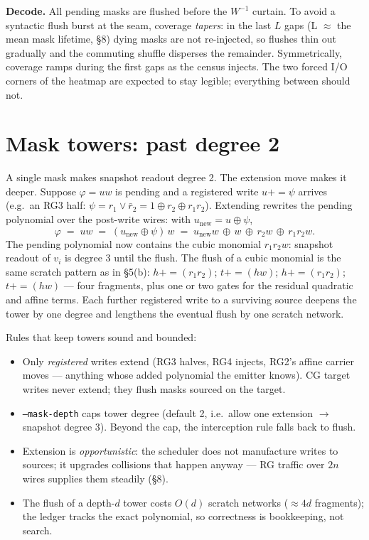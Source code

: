 \documentclass[11pt]{article}
\newcommand{\code}[1]{\texttt{#1}}
\newcommand{\pe}{\mathrel{{+}{=}}}    %
\begin{document}
\textbf{Decode.} All pending masks are flushed before the $W^{-1}$
curtain. To avoid a syntactic flush burst at the seam, coverage
\emph{tapers}: in the last $L$ gaps (L $\approx$ the mean mask lifetime,
\S8) dying masks are not re-injected, so flushes thin out gradually and
the commuting shuffle disperses the remainder. Symmetrically, coverage
ramps during the first gaps as the census injects. The two forced I/O
corners of the heatmap are expected to stay legible; everything between
should not.

\section{Mask towers: past degree 2}\label{sec:towers}

A single mask makes snapshot readout degree 2. The extension move makes it
deeper. Suppose $\varphi = u w$ is pending and a registered write $u \pe
\psi$ arrives (e.g.\ an RG3 half: $\psi = r_1 \vee \bar r_2 = 1 \oplus r_2
\oplus r_1 r_2$). Extending rewrites the pending polynomial over the
post-write wires: with $u_{\text{new}} = u \oplus \psi$,
\[
\varphi \;=\; u w \;=\; (u_{\text{new}} \oplus \psi)\,w
\;=\; u_{\text{new}} w \,\oplus\, w \,\oplus\, r_2 w \,\oplus\, r_1 r_2 w .
\]
The pending polynomial now contains the cubic monomial $r_1 r_2 w$:
snapshot readout of $v_i$ is degree 3 until the flush. The flush of a
cubic monomial is the same scratch pattern as in \S5(b):
$h \pe (r_1 r_2)$; $t \pe (h w)$; $h \pe (r_1 r_2)$; $t \pe (h w)$ ---
four fragments, plus one or two gates for the residual quadratic and
affine terms. Each further registered write to a surviving source deepens
the tower by one degree and lengthens the eventual flush by one scratch
network.

Rules that keep towers sound and bounded:
\begin{itemize}
\item Only \emph{registered} writes extend (RG3 halves, RG4 injects, RG2's
affine carrier moves --- anything whose added polynomial the emitter
knows). CG target writes never extend; they flush masks sourced on the
target.
\item \code{--mask-depth} caps tower degree (default 2, i.e.\ allow one
extension $\to$ snapshot degree 3). Beyond the cap, the interception rule
falls back to flush.
\item Extension is \emph{opportunistic}: the scheduler does not
manufacture writes to sources; it upgrades collisions that happen anyway
--- RG traffic over $2n$ wires supplies them steadily (\S8).
\item The flush of a depth-$d$ tower costs $O(d)$ scratch networks
($\approx 4d$ fragments); the ledger tracks the exact polynomial, so
correctness is bookkeeping, not search.
\end{itemize}
\end{document}
